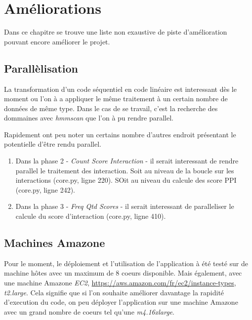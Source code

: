 \chapter{Améliorations}
\label{ch:improve}

Dans ce chapitre se trouve une liste non exaustive de piste d'amélioration pouvant encore améliorer le projet. 

\section{Parallèlisation}

La transformation d'un code séquentiel en code linéaire est interessant dès le moment ou l'on à a appliquer le même traitement à un certain nombre de données de même type. Dans le cas de se travail, c'est la recherche des dommaines avec \emph{hmmscan} que l'on à pu rendre parallel.

Rapidement ont peu noter un certains nombre d'autres endroit présentant le potentielle d'être rendu parallel.

\begin{enumerate}
\item Dans la phase 2 - \emph{Count Score Interaction} - il serait interessant de rendre parallel le traitement des interaction. Soit au niveau de la boucle sur les interactions (core.py, ligne 220). SOit au niveau du calcule des score PPI (core.py, ligne 242).
\item Dans la phase 3 - \emph{Freq Qtd Scores} - il serait interessant de paralleliser le calcule du score d'interaction (core.py, ligne 410).
\end{enumerate}

\section{Machines Amazone}

Pour le moment, le déploiement et l'utilisation de l'application à été testé sur de machine hôtes avec un maximum de 8 coeurs disponible. Mais également, avec une machine Amazone \emph{EC2}, \url{https://aws.amazon.com/fr/ec2/instance-types}, \emph{t2.large}. Cela signifie que si l'on souhaite améliorer davantage la rapidité d'execution du code, on peu déployer l'application sur une machine Amazone avec un grand nombre de coeurs tel qu'une \emph{m4.16xlarge}.
